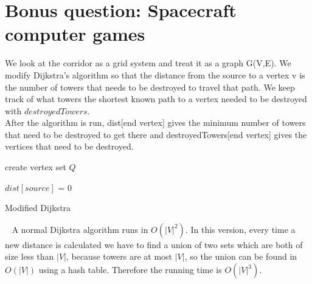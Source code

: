 \documentclass[a4paper]{article}
\begin{document}
\section{Bonus question: Spacecraft computer games}
We look at the corridor as a grid system and treat it as a graph G(V,E). We modify Dijkstra's algorithm so that the distance from the source to a vertex v is the number of towers that needs to be destroyed to travel that path. We keep track of what towers the shortest known path to a vertex needed to be destroyed with $destroyedTowers$. \\
After the algorithm is run, dist[end vertex] gives the minimum number of towers that need to be destroyed to get there and destroyedTowers[end vertex] gives the vertices that need to be destroyed.
\begin{algorithm}[H]
  
  create vertex set $Q$\;
  
  
  $dist[source]$ = 0\;
    
  \caption{Modified Dijkstra}
\end{algorithm}
~\newline
A normal Dijkstra algorithm runs in $O(|V|^2)$. In this version, every time a new distance is calculated we have to find a union of two sets which are both of size less than $|V|$, because towers are at most $|V|$, so the union can be found in $O(|V|)$ using a hash table. Therefore the running time is $O(|V|^3)$.
\end{document}
